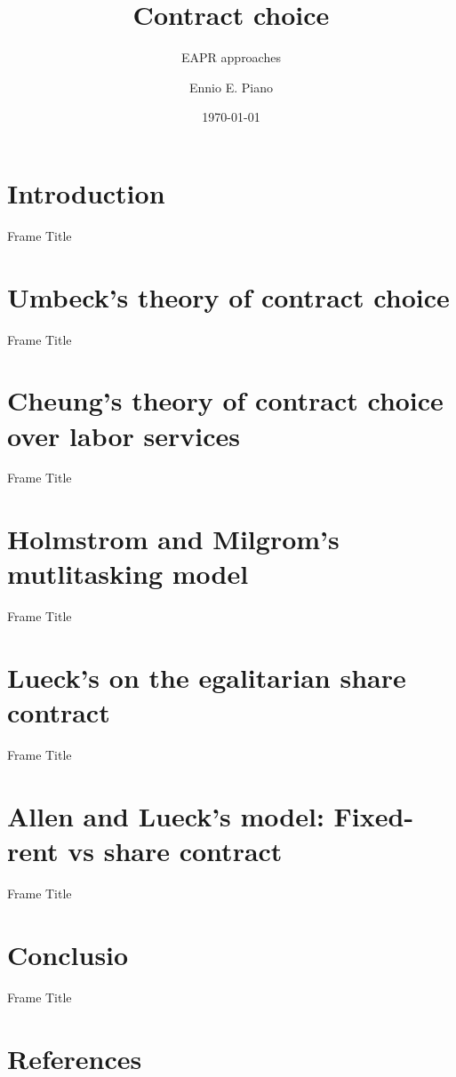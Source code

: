 \documentclass[10pt]{beamer}
\title[Contract choice]{Contract choice}
\subtitle{EAPR approaches}
\author[Piano]{Ennio E. Piano}
\institute[MTSU \& PERI]{MTSU \& PERI} %
\date[\today]{\today}
\begin{document}
\begin{frame}
\titlepage

\end{frame}

\section{Introduction}
\begin{frame}{Frame Title}
    
\end{frame}

\section{Umbeck's theory of contract choice}
\begin{frame}{Frame Title}
    
\end{frame}

\section{Cheung's theory of contract choice over labor services}
\begin{frame}{Frame Title}
    
\end{frame}

\section{Holmstrom and Milgrom's mutlitasking model}
\begin{frame}{Frame Title}
    
\end{frame}

\section{Lueck's on the egalitarian share contract}
\begin{frame}{Frame Title}
    
\end{frame}

\section{Allen and Lueck's model: Fixed-rent vs share contract}
\begin{frame}{Frame Title}
    
\end{frame}

\section{Conclusio}
\begin{frame}{Frame Title}
    
\end{frame}

\section{References}
\begin{frame}
    
\end{frame}
\end{document}

